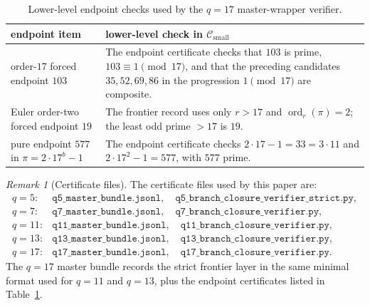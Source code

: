\documentclass[11pt]{article}
\theoremstyle{definition}
\theoremstyle{remark}
\newtheorem{remark}[theorem]{Remark}
\DeclareMathOperator{\ord}{ord}
\newcommand{\Csmall}{\ensuremath{\mathcal C_{\mathrm{small}}}}
\begin{document}
\begin{table}[ht]
\centering
\small
\begin{tabular}{p{}|p{}}
\toprule
endpoint item & lower-level check in \(\Csmall\)\\
\midrule
order-\(17\) forced endpoint \(103\) &
The endpoint certificate checks that \(103\) is prime, \(103\equiv1\pmod{17}\),
and that the preceding candidates \(35,52,69,86\) in the progression
\(1\pmod{17}\) are composite.\\
Euler order-two forced endpoint \(19\) &
The frontier record uses only \(r>17\) and \(\ord_r(\pi)=2\); the least odd
prime \(>17\) is \(19\).\\
pure endpoint \(577\) in \(\pi=2\cdot17^b-1\) &
The endpoint certificate checks \(2\cdot17-1=33=3\cdot11\) and
\(2\cdot17^2-1=577\), with \(577\) prime.\\
\bottomrule
\end{tabular}
\caption{Lower-level endpoint checks used by the \(q=17\) master-wrapper
verifier.}
\label{tab:q17-endpoint-certificates}
\end{table}
\FloatBarrier

\begin{remark}[Certificate files]
The certificate files used by this paper are:
\[
\begin{array}{ll}
q=5: & \texttt{q5\_master\_bundle.jsonl},\quad
       \texttt{q5\_branch\_closure\_verifier\_strict.py},\\
q=7: & \texttt{q7\_master\_bundle.jsonl},\quad
       \texttt{q7\_branch\_closure\_verifier.py},\\
q=11: & \texttt{q11\_master\_bundle.jsonl},\quad
        \texttt{q11\_branch\_closure\_verifier.py},\\
q=13: & \texttt{q13\_master\_bundle.jsonl},\quad
        \texttt{q13\_branch\_closure\_verifier.py},\\
q=17: & \texttt{q17\_master\_bundle.jsonl},\quad
        \texttt{q17\_branch\_closure\_verifier.py}.
\end{array}
\]
The \(q=17\) master bundle records the strict frontier layer in the same
minimal format used for \(q=11\) and \(q=13\), plus the endpoint certificates
listed in Table~\ref{tab:q17-endpoint-certificates}.
\end{remark}
\end{document}

